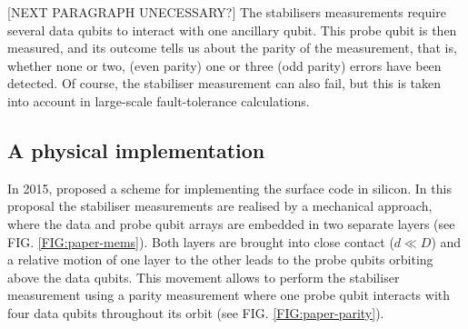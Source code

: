 [NEXT PARAGRAPH UNECESSARY?]
The stabilisers measurements require several data qubits to interact with one ancillary qubit. This probe qubit is then measured, and its outcome tells us about the parity of the measurement, that is, whether none or two,  (even parity) one  or three (odd parity) errors have been detected. Of course, the stabiliser measurement can also fail, but this is taken into account in large-scale fault-tolerance calculations. 




\subsection{A physical implementation} \label{sec:PhysicalImplementation}
In 2015, \citet{OGorman2016} proposed a scheme for implementing the surface code in silicon. In this proposal the stabiliser measurements are realised by a mechanical approach, where the data and probe qubit arrays are embedded in two separate layers (see FIG. \ref{FIG:paper-mems}). Both layers are brought into close contact ($d\ll D$) and a relative motion of one layer to the other leads to the probe qubits orbiting above the data qubits. This movement allows to perform the stabiliser measurement using a parity measurement where one probe qubit interacts with four data qubits throughout its orbit (see FIG. \ref{FIG:paper-parity}). 


\begin{figure}[H]
	\centering
	\\
	\caption[oddeven]{}
	\label{FIG:paper}
\end{figure}

